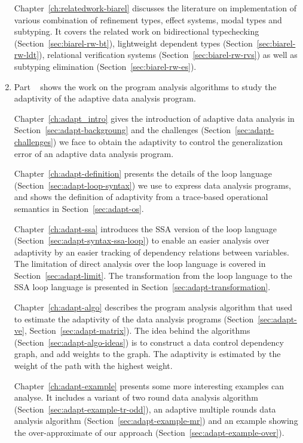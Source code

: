 \begin{enumerate}
    Chapter~\ref{ch:relatedwork-biarel} discusses the literature on implementation of various combination of refinement types, effect systems, modal types and subtyping. It covers the related work on bidirectional typechecking (Section~\ref{sec:biarel-rw-bt}), lightweight dependent types (Section~\ref{sec:biarel-rw-ldt}), relational verification systems (Section~\ref{sec:biarel-rw-rvs}) as well as subtyping elimination (Section~\ref{sec:biarel-rw-es}).
    
    
\item Part ~ shows the work on the program analysis algorithms to study the adaptivity of the adaptive data analysis program.    

Chapter~\ref{ch:adapt_intro} gives the introduction of adaptive data analysis in Section~\ref{sec:adapt-backgroung} and the challenges (Section~\ref{sec:adapt-challenges}) we face to obtain the adaptivity to control the generalization error of an adaptive data analysis program.

Chapter~\ref{ch:adapt-definition} presents the details of the loop language (Section~\ref{sec:adapt-loop-syntax}) we use to express data analysis programs, and shows the definition of adaptivity from a trace-based operational semantics in Section~\ref{sec:adapt-os}. 

Chapter~\ref{ch:adapt-ssa} introduces the SSA version of the loop language (Section~\ref{sec:adapt-syntax-ssa-loop}) to enable an easier analysis over adaptivity by an easier tracking of dependency relations between variables. The limitation of direct analysis over the loop language is covered in Section~\ref{sec:adapt-limit}. The transformation from the loop language to the SSA loop language is presented in Section~\ref{sec:adapt-transformation}.

Chapter~\ref{ch:adapt-algo} describes the program analysis algorithm {\ADAPTSYSTEM} that used to estimate the adaptivity of the data analysis programs (Section~\ref{sec:adapt-ve}, Section~\ref{sec:adapt-matrix}). The idea behind the algorithms (Section~\ref{sec:adapt-algo-ideas}) is to construct a data control dependency graph, and add weights to the graph. The adaptivity is estimated by the weight of the path with the highest weight.

Chapter~\ref{ch:adapt-example} presents some more interesting examples {\ADAPTSYSTEM} can analyse. It includes a variant of two round data analysis algorithm (Section~\ref{sec:adapt-example-tr-odd}), an adaptive multiple rounds data analysis algorithm (Section~\ref{sec:adapt-example-mr}) and an example showing the over-approximate of our approach (Section~\ref{sec:adapt-example-over}). 


\end{enumerate}
